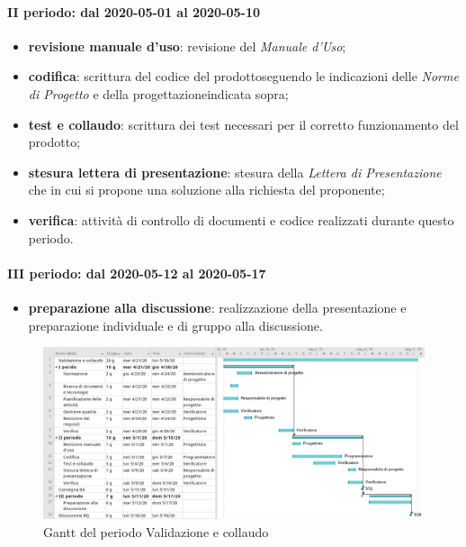 \paragraph*{II periodo: dal 2020-05-01 al 2020-05-10}
\begin{itemize}
	\item \textbf{revisione manuale d'uso}: revisione del \textit{Manuale d'Uso};
	\item \textbf{codifica}: scrittura del codice del prodotto\glosp seguendo le indicazioni delle \textit{Norme di Progetto} e della progettazione\glosp indicata sopra;
	\item \textbf{test e collaudo}: scrittura dei test necessari per il corretto funzionamento del prodotto\glo;
	\item \textbf{stesura lettera di presentazione}: stesura della \textit{Lettera di Presentazione} che in cui si propone una soluzione alla richiesta del proponente;
	\item \textbf{verifica}: attività di controllo di documenti e codice realizzati durante questo periodo.
\end{itemize}

\paragraph*{III periodo: dal 2020-05-12 al 2020-05-17}
\begin{itemize}
	\item \textbf{preparazione alla discussione}: realizzazione della presentazione e preparazione individuale e di gruppo alla discussione.
\end{itemize}
\begin{landscape}
	\begin{figure}[H] 	
		\includegraphics[width=\linewidth]{./gantt/Validazione e collaudo.png}	
		\caption{Gantt del periodo Validazione e collaudo}	
	\end{figure}
\end{landscape}
